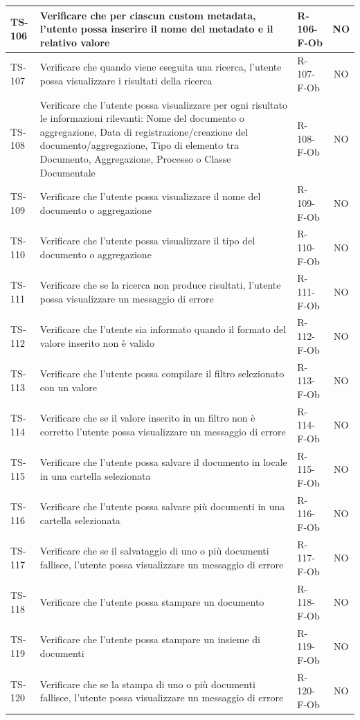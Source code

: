 \documentclass[a4paper,12pt]{article}
\begin{document}
\begin{longtable}{|p{1.5cm}|p{8.3cm}|p{2.4cm}|c|}
\hline
TS-106 & Verificare che per ciascun custom metadata, l'utente possa inserire il nome del metadato e il relativo valore & R-106-F-Ob & NO \\
\hline
TS-107 & Verificare che quando viene eseguita una ricerca, l'utente possa visualizzare i risultati della ricerca & R-107-F-Ob & NO \\
\hline
TS-108 & Verificare che l'utente possa visualizzare per ogni risultato le informazioni rilevanti: Nome del documento o aggregazione, Data di registrazione/creazione del documento/aggregazione, Tipo di elemento tra Documento, Aggregazione, Processo o Classe Documentale & R-108-F-Ob & NO \\
\hline
TS-109 & Verificare che l'utente possa visualizzare il nome del documento o aggregazione & R-109-F-Ob & NO \\
\hline
TS-110 & Verificare che l'utente possa visualizzare il tipo del documento o aggregazione & R-110-F-Ob & NO \\
\hline
TS-111 & Verificare che se la ricerca non produce risultati, l'utente possa visualizzare un messaggio di errore & R-111-F-Ob & NO \\
\hline
TS-112 & Verificare che l'utente sia informato quando il formato del valore inserito non è valido & R-112-F-Ob & NO \\
\hline
TS-113 & Verificare che l'utente possa compilare il filtro selezionato con un valore & R-113-F-Ob & NO \\
\hline
TS-114 & Verificare che se il valore inserito in un filtro non è corretto l'utente possa visualizzare un messaggio di errore & R-114-F-Ob & NO \\
\hline
TS-115 & Verificare che l'utente possa salvare il documento in locale in una cartella selezionata & R-115-F-Ob & NO \\
\hline
TS-116 & Verificare che l'utente possa salvare più documenti in una cartella selezionata & R-116-F-Ob & NO \\
\hline
TS-117 & Verificare che se il salvataggio di uno o più documenti fallisce, l'utente possa visualizzare un messaggio di errore & R-117-F-Ob & NO \\
\hline
TS-118 & Verificare che l'utente possa stampare un documento & R-118-F-Ob & NO \\
\hline
TS-119 & Verificare che l'utente possa stampare un insieme di documenti & R-119-F-Ob & NO \\
\hline
TS-120 & Verificare che se la stampa di uno o più documenti fallisce, l'utente possa visualizzare un messaggio di errore & R-120-F-Ob & NO \\

\end{longtable}
\end{document}

